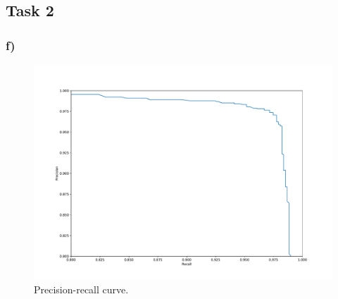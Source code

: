 \subsection*{Task 2}

\subsubsection*{f)}

\begin{figure}[h!]
  \centering
  \includegraphics[width=\textwidth]{figures/Task2f.pdf}
  \caption{Precision-recall curve.}
  \label{fig:task2:f}
\end{figure}
